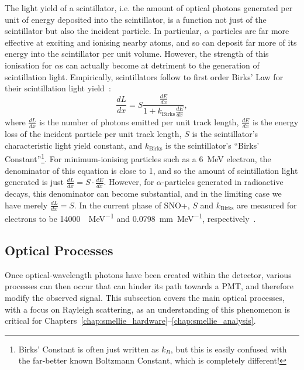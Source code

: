 The light yield of a scintillator, i.e. the amount of optical photons generated per unit of energy deposited into the scintillator, is a function not just of the scintillator but also the incident particle. In particular, $\alpha$ particles are far more effective at exciting and ionising nearby atoms, and so can deposit far more of its energy into the scintillator per unit volume. However, the strength of this ionisation for $\alpha$s can actually become at detriment to the generation of scintillation light. Empirically, scintillators follow to first order Birks' Law for their scintillation light yield~\cite{}: %
\begin{equation}
    \frac{dL}{dx} = S\frac{\frac{dE}{dx}}{1+k_{\mathrm{Birks}}\frac{dE}{dx}},
\end{equation}
where $\frac{dL}{dx}$ is the number of photons emitted per unit track length, $\frac{dE}{dx}$ is the energy loss of the incident particle per unit track length, $S$ is the scintillator's characteristic light yield constant, and $k_{\mathrm{Birks}}$ is the scintillator's ``Birks' Constant''\footnote{Birks' Constant is often just written as $k_{B}$, but this is easily confused with the far-better known Boltzmann Constant, which is completely different!}. 
For minimum-ionising particles such as a \SI{6}{\MeV} electron, the denominator of this equation is close to 1, and so the amount of scintillation light generated is just $\frac{dL}{dx} = S\cdot\frac{dE}{dx}$. However, for $\alpha$-particles generated in radioactive decays, this denominator can become substantial, and in the limiting case we have merely $\frac{dL}{dx} = S$. In the current phase of SNO+, $S$ and $k_{\mathrm{Birks}}$ are measured for electrons to be \SI{14000}{\gamma\per\MeV} and \SI{0.0798}{\mm\per\MeV}, respectively~\cite{}. %

 \subsection{Optical Processes}\label{sec:optical_processes}
 Once optical-wavelength photons have been created within the detector, various processes can then occur that can hinder its path towards a PMT, and therefore modify the observed signal. This subsection covers the main optical processes, with a focus on Rayleigh scattering, as an understanding of this phenomenon is critical for Chapters~\ref{chap:smellie_hardware}--\ref{chap:smellie_analysis}.
